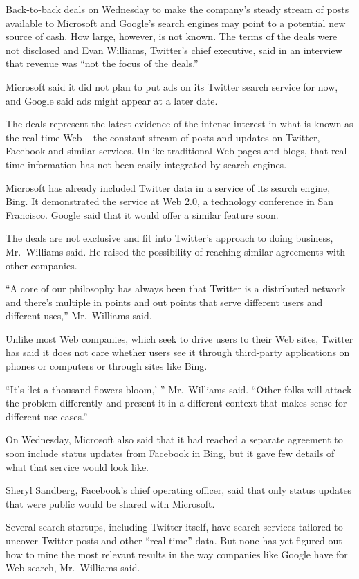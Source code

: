 ﻿\documentclass[12pt]{article}
\begin{document}
Back-to-back deals on Wednesday to make the company's steady stream of posts available to Microsoft
and Google's search engines may point to a potential new source of cash. How large, however, is not
known. The terms of the deals were not disclosed and Evan Williams, Twitter's chief executive, said
in an interview that revenue was ``not the focus of the deals.''

Microsoft said it did not plan to put ads on its Twitter search service for now, and Google said ads
might appear at a later date.

The deals represent the latest evidence of the intense interest in what is known as the real-time
Web -- the constant stream of posts and updates on Twitter, Facebook and similar services. Unlike
traditional Web pages and blogs, that real-time information has not been easily integrated by search
engines.

Microsoft has already included Twitter data in a service of its search engine, Bing. It demonstrated
the service at Web 2.0, a technology conference in San Francisco. Google said that it would offer a
similar feature soon.

The deals are not exclusive and fit into Twitter's approach to doing business, Mr.~Williams said. He
raised the possibility of reaching similar agreements with other companies.

``A core of our philosophy has always been that Twitter is a distributed network and there's
multiple in points and out points that serve different users and different uses,'' Mr.~Williams
said.

Unlike most Web companies, which seek to drive users to their Web sites, Twitter has said it does
not care whether users see it through third-party applications on phones or computers or through
sites like Bing.

``It's `let a thousand flowers bloom,' '' Mr.~Williams said. ``Other folks will attack the problem
differently and present it in a different context that makes sense for different use cases.''

On Wednesday, Microsoft also said that it had reached a separate agreement to soon include status
updates from Facebook in Bing, but it gave few details of what that service would look like.

Sheryl Sandberg, Facebook's chief operating officer, said that only status updates that were public
would be shared with Microsoft.

Several search startups, including Twitter itself, have search services tailored to uncover Twitter
posts and other ``real-time'' data. But none has yet figured out how to mine the most relevant
results in the way companies like Google have for Web search, Mr.~Williams said.
\end{document}
